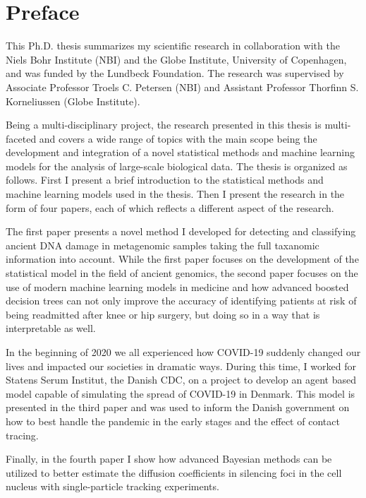 \chapter{Preface}
This Ph.D. thesis summarizes my scientific research in collaboration with the Niels Bohr Institute (NBI) and the Globe Institute, University of Copenhagen, and was funded by the Lundbeck Foundation. The research was supervised by Associate Professor Troels C. Petersen (NBI) and Assistant Professor Thorfinn S. Korneliussen (Globe Institute).

Being a multi-disciplinary project, the research presented in this thesis is multi-faceted and covers a wide range of topics with the main scope being the development and integration of a novel statistical methods and machine learning models for the analysis of large-scale biological data. The thesis is organized as follows. First I present a brief introduction to the statistical methods and machine learning models used in the thesis. Then I present the research in the form of four papers, each of which reflects a different aspect of the research.

The first paper presents a novel method I developed for detecting and classifying ancient DNA damage in metagenomic samples taking the full taxanomic information into account. While the first paper focuses on the development of the statistical model in the field of ancient genomics, the second paper focuses on the use of modern machine learning models in medicine and how advanced boosted decision trees can not only improve the accuracy of identifying patients at risk of being readmitted after knee or hip surgery, but doing so in a way that is interpretable as well.

In the beginning of 2020 we all experienced how COVID-19 suddenly changed our lives and impacted our societies in dramatic ways. During this time, I worked for Statens Serum Institut, the Danish CDC, on a project to develop an agent based model capable of simulating the spread of COVID-19 in Denmark. This model is presented in the third paper and was used to inform the Danish government on how to best handle the pandemic in the early stages and the effect of contact tracing.

Finally, in the fourth paper I show how advanced Bayesian methods can be utilized to better estimate the diffusion coefficients in silencing foci in the cell nucleus with single-particle tracking experiments. 

